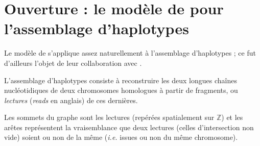 \section{Ouverture : le modèle de \SB{} pour l'assemblage d'haplotypes}
\label{sec:chapII_haplotypes}

Le modèle de \SB{} s'applique assez naturellement à l'assemblage d'haplotypes ; ce fut d'ailleurs l'objet de leur collaboration avec  \cite{SankararamanVikaloBaccelli2020}.

L'assemblage d'haplotypes consiste à reconstruire les deux longues chaînes nucléotidiques de deux chromosomes homologues à partir de fragments, ou \emph{lectures} (\emph{reads} en anglais) de ces dernières.

Les sommets du graphe sont les lectures (repérées spatialement sur $\mathbb Z$) et les arêtes représentent la vraisemblance que deux lectures (celles d'intersection non vide) soient ou non de la même  (\emph{i.e.} issues ou non du même chromosome).

